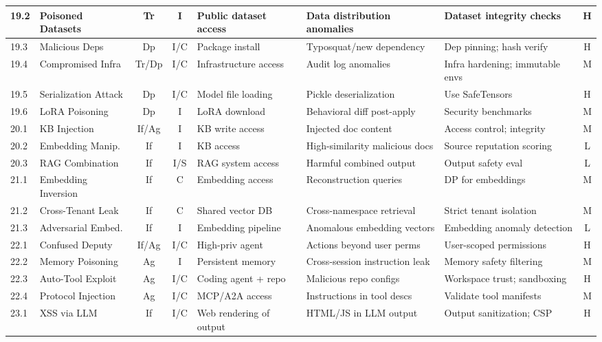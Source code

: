 \documentclass[conference]{IEEEtran}
\begin{document}
{\begin{longtable}{p{0.7cm}p{1.5cm}ccp{1.6cm}p{1.5cm}p{1.6cm}c}
\midrule
19.2 & Poisoned Datasets & Tr & I & Public dataset access & Data distribution anomalies & Dataset integrity checks & H \\
\midrule
19.3 & Malicious Deps & Dp & I/C & Package install & Typosquat/new dependency & Dep pinning; hash verify & H \\
\midrule
19.4 & Compromised Infra & Tr/Dp & I/C & Infrastructure access & Audit log anomalies & Infra hardening; immutable envs & M \\
\midrule
19.5 & Serialization Attack & Dp & I/C & Model file loading & Pickle deserialization & Use SafeTensors & H \\
\midrule
19.6 & LoRA Poisoning & Dp & I & LoRA download & Behavioral diff post-apply & Security benchmarks & M \\
\midrule
20.1 & KB Injection & If/Ag & I & KB write access & Injected doc content & Access control; integrity & M \\
\midrule
20.2 & Embedding Manip. & If & I & KB access & High-similarity malicious docs & Source reputation scoring & L \\
\midrule
20.3 & RAG Combination & If & I/S & RAG system access & Harmful combined output & Output safety eval & L \\
\midrule
21.1 & Embedding Inversion & If & C & Embedding access & Reconstruction queries & DP for embeddings & M \\
\midrule
21.2 & Cross-Tenant Leak & If & C & Shared vector DB & Cross-namespace retrieval & Strict tenant isolation & M \\
\midrule
21.3 & Adversarial Embed. & If & I & Embedding pipeline & Anomalous embedding vectors & Embedding anomaly detection & L \\
\midrule
22.1 & Confused Deputy & If/Ag & I/C & High-priv agent & Actions beyond user perms & User-scoped permissions & H \\
\midrule
22.2 & Memory Poisoning & Ag & I & Persistent memory & Cross-session instruction leak & Memory safety filtering & M \\
\midrule
22.3 & Auto-Tool Exploit & Ag & I/C & Coding agent + repo & Malicious repo configs & Workspace trust; sandboxing & H \\
\midrule
22.4 & Protocol Injection & Ag & I/C & MCP/A2A access & Instructions in tool descs & Validate tool manifests & M \\
\midrule
23.1 & XSS via LLM & If & I/C & Web rendering of output & HTML/JS in LLM output & Output sanitization; CSP & H \\

\end{longtable}}
\end{document}
